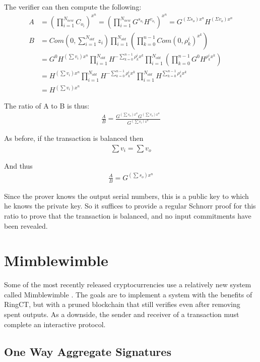 \documentclass{article}
\begin{document}
The verifier can then compute the following:
\begin{align}
  A &= (\prod_{i=1}^{N_{new}}{C_{o_i}})^{x^n} = (\prod_{i=1}^{N_{new}}{G^{s_{o_i}} H^{v_{o_i}}})^{x^n}  =  G^{(\Sigma s_o) x^n}  H^{(\Sigma v_o) x^n}\\
  B &= Com(0, \sum_{i=1}^{N_{old}}{z_i}) \prod_{i=1}^{N_{old}}{(\prod_{k=0}^{n-1} Com(0, \rho_k^i)^{x^k})}\\
    &= G^0 H^{(\sum{v_i}) x^n} \prod_{i=1}^{N_{old}}{H^{-\sum_{k=0}^{n-1}{\rho_k^i x^k}}} \prod_{i=1}^{N_{old}}{(\prod_{k=0}^{n-1}{G^0 H^{\rho_k^i x^k}})}\\
    &= H^{(\sum{v_i}) x^n} \prod_{i=1}^{N_{old}}{H^{-\sum_{k=0}^{n-1}{\rho_k^i x^k}}}  \prod_{i=1}^{N_{old}}{H^{\sum_{k=0}^{n-1}{\rho_k^i x^k}}}\\
    &= H^{(\sum{v_i}) x^n}
\end{align}

The ratio of A to B is thus:
\begin{align}
  \frac{A}{B} = \frac{G^{(\sum{s_o}) x^n} G^{(\sum{v_o}) x^n}}{G^{(\sum{v_i}) x^n}}
\end{align}
  
As before, if the transaction is balanced then 
\begin{align}
  \sum{v_i} = \sum{v_o}
\end{align}

And thus
\begin{align}
  \frac{A}{B} = G^{(\sum{s_o}) x^n}
\end{align}

Since the prover knows the output serial numbers, this is a public key to which he knows the private key.  So it suffices to provide a regular Schnorr proof for this ratio to prove that the transaction is balanced, and no input commitments have been revealed.



\section{Mimblewimble}

Some of the most recently released cryptocurrencies use a relatively new system called Mimblewimble \cite{mimblewimble}.  The goals are to implement a system with the benefits of RingCT, but with a pruned blockchain that still verifies even after removing spent outputs.  As a downside, the sender and receiver of a transaction must complete an interactive protocol.


\subsection{One Way Aggregate Signatures}
\end{document}
